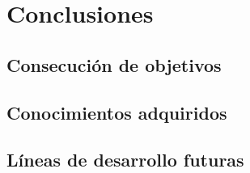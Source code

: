 
\chapter{Conclusiones} %

\label{Chapter5} %


\section{Consecución de objetivos}


\section{Conocimientos adquiridos}


\section{Líneas de desarrollo futuras}
